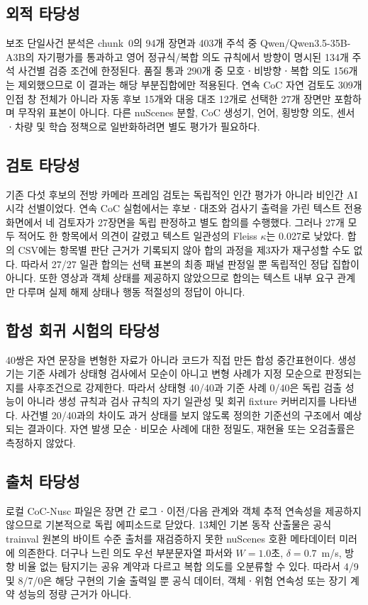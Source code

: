 \subsection{외적 타당성}
보조 단일사건 분석은 chunk~0의 94개 장면과 403개 주석 중 Qwen/Qwen3.5-35B-A3B의 자기평가를 통과하고 영어 정규식/복합 의도 규칙에서 방향이 명시된 134개 주석 사건별 검증 조건에 한정된다. 품질 통과 290개 중 모호ㆍ비방향ㆍ복합 의도 156개는 제외했으므로 이 결과는 해당 부분집합에만 적용된다. 연속 CoC 자연 검토도 309개 인접 창 전체가 아니라 자동 후보 15개와 대응 대조 12개로 선택한 27개 장면만 포함하며 무작위 표본이 아니다. 다른 nuScenes 분할, CoC 생성기, 언어, 횡방향 의도, 센서ㆍ차량 및 학습 정책으로 일반화하려면 별도 평가가 필요하다.

\subsection{검토 타당성}
기존 다섯 후보의 전방 카메라 프레임 검토는 독립적인 인간 평가가 아니라 비인간 AI 시각 선별이었다. 연속 CoC 실험에서는 후보ㆍ대조와 검사기 출력을 가린 텍스트 전용 화면에서 네 검토자가 27장면을 독립 판정하고 별도 합의를 수행했다. 그러나 27개 모두 적어도 한 항목에서 의견이 갈렸고 텍스트 일관성의 Fleiss $\kappa$는 0.027로 낮았다. 합의 CSV에는 항목별 판단 근거가 기록되지 않아 합의 과정을 제3자가 재구성할 수도 없다. 따라서 27/27 일관 합의는 선택 표본의 최종 패널 판정일 뿐 독립적인 정답 집합이 아니다. 또한 영상과 객체 상태를 제공하지 않았으므로 합의는 텍스트 내부 요구 관계만 다루며 실제 해제 상태나 행동 적절성의 정답이 아니다.

\subsection{합성 회귀 시험의 타당성}
40쌍은 자연 문장을 변형한 자료가 아니라 코드가 직접 만든 합성 중간표현이다. 생성기는 기준 사례가 상태형 검사에서 모순이 아니고 변형 사례가 지정 모순으로 판정되는지를 사후조건으로 강제한다. 따라서 상태형 40/40과 기준 사례 0/40은 독립 검출 성능이 아니라 생성 규칙과 검사 규칙의 자기 일관성 및 회귀 fixture 커버리지를 나타낸다. 사건별 20/40과의 차이도 과거 상태를 보지 않도록 정의한 기준선의 구조에서 예상되는 결과이다. 자연 발생 모순ㆍ비모순 사례에 대한 정밀도, 재현율 또는 오검출률은 측정하지 않았다.

\subsection{출처 타당성}
로컬 CoC-Nusc 파일은 장면 간 로그ㆍ이전/다음 관계와 객체 추적 연속성을 제공하지 않으므로 기본적으로 독립 에피소드로 닫았다. 13체인 기본 동작 산출물은 공식 trainval 원본의 바이트 수준 출처를 재검증하지 못한 nuScenes 호환 메타데이터 미러에 의존한다. 더구나 느린 의도 우선 부분문자열 파서와 $W=1.0$초, $\delta=0.7$~m/s, 방향 비율 없는 탐지기는 공유 계약과 다르고 복합 의도를 오분류할 수 있다. 따라서 4/9 및 8/7/0은 해당 구현의 기술 출력일 뿐 공식 데이터, 객체ㆍ위험 연속성 또는 장기 계약 성능의 정량 근거가 아니다.

